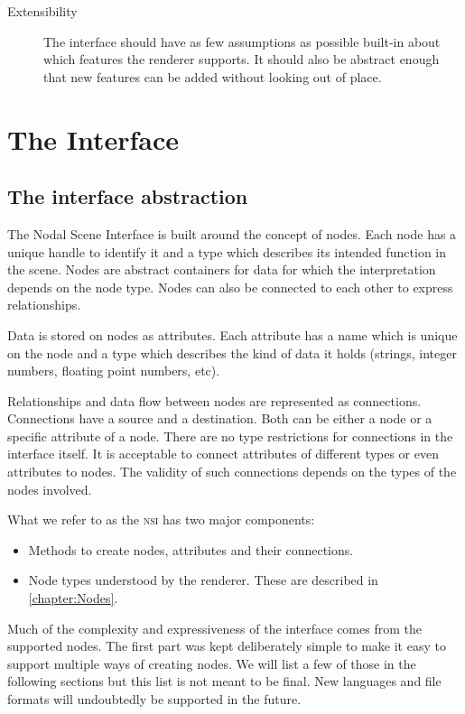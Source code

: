 \documentclass[oneside,ebook]{memoir}
\newcommand*{\acronym}[1]{\textsc{\lowercase{#1}}}
\begin{document}
\begin{description}
\item[Extensibility]
The interface should have as few assumptions as possible built-in about which features the renderer supports. It should also be abstract enough that new features can be added without looking out of place.

\end{description}

\chapter{The Interface}

\section{The interface abstraction}

The Nodal Scene Interface is built around the concept of nodes. Each node has a unique handle to identify it and a type which describes its intended function in the scene. Nodes are abstract containers for data for which the interpretation depends on the node type. Nodes can also be connected to each other to express relationships.

Data is stored on nodes as attributes. Each attribute has a name which is unique on the node and a type which describes the kind of data it holds (strings, integer numbers, floating point numbers, etc).

Relationships and data flow between nodes are represented as connections. Connections have a source and a destination. Both can be either a node or a specific attribute of a node. There are no type restrictions for connections in the interface itself. It is acceptable to connect attributes of different types or even attributes to nodes. The validity of such connections depends on the types of the nodes involved.

What we refer to as the \acronym{NSI} has two major components:
\begin{itemize}
\item Methods to create nodes, attributes and their connections.
\item Node types understood by the renderer. These are described in \autoref{chapter:Nodes}.
\end{itemize}

Much of the complexity and expressiveness of the interface comes from the supported nodes. The first part was kept deliberately simple to make it easy to support multiple ways of creating nodes. We will list a few of those in the following sections but this list is not meant to be final. New languages and file formats will undoubtedly be supported in the future.
\end{document}
